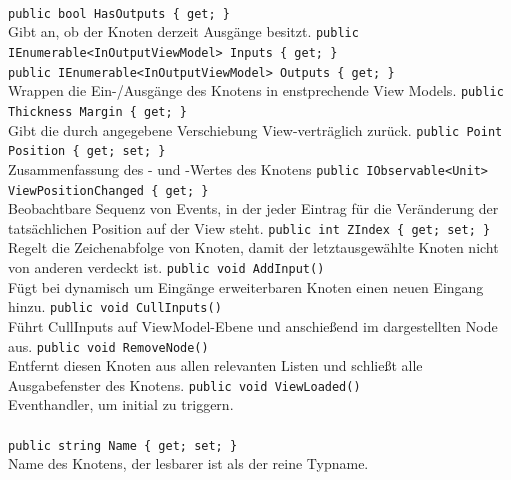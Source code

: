 \paragraph{}
\begin{itemize}
	\add \verb!public bool HasOutputs { get; }! \\
	Gibt an, ob der Knoten derzeit Ausgänge besitzt.
	\add \verb!public IEnumerable<InOutputViewModel> Inputs { get; }! \\
	\verb!public IEnumerable<InOutputViewModel> Outputs { get; }! \\
	Wrappen die Ein-/Ausgänge des Knotens in enstprechende View Models.
	\add \verb!public Thickness Margin { get; }! \\
	Gibt die durch  angegebene Verschiebung View-verträglich zurück.
	\add \verb!public Point Position { get; set; }! \\
	Zusammenfassung des - und -Wertes des Knotens
	\add \verb!public IObservable<Unit> ViewPositionChanged { get; }! \\
	Beobachtbare Sequenz von Events, in der jeder Eintrag für die Veränderung der tatsächlichen Position auf der View steht.
	\add \verb!public int ZIndex { get; set; }! \\
	Regelt die Zeichenabfolge von Knoten, damit der letztausgewählte Knoten nicht von anderen verdeckt ist.
	\add \verb!public void AddInput()! \\
	Fügt bei dynamisch um Eingänge erweiterbaren Knoten einen neuen Eingang hinzu.
	\add \verb!public void CullInputs()! \\
	Führt CullInputs auf ViewModel-Ebene und anschießend im dargestellten Node aus.
	\add \verb!public void RemoveNode()! \\
	Entfernt diesen Knoten aus allen relevanten Listen und schließt alle Ausgabefenster des Knotens.
	\add \verb!public void ViewLoaded()! \\
	Eventhandler, um  initial zu triggern.
\end{itemize}

\paragraph{}
\begin{itemize}
	\add \verb!public string Name { get; set; }! \\
	Name des Knotens, der lesbarer ist als der reine Typname.
\end{itemize}

